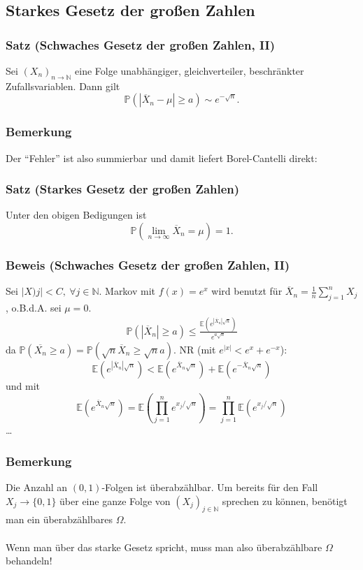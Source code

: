 \subsection{Starkes Gesetz der gro\ss{}en Zahlen}
\subsubsection{Satz (Schwaches Gesetz der gro\ss{}en Zahlen, II)}
Sei $(X_n)_{n\to\mathbb{N}}$ eine Folge unabh\"angiger, gleichverteiler, beschr\"ankter Zufallsvariablen. Dann gilt
\[
\mathbb{P}(|\overline{X}_n-\mu|\geq a)\sim e^{-\sqrt{n}}.
\]
\subsubsection{Bemerkung}
Der ``Fehler'' ist also summierbar und damit liefert Borel-Cantelli direkt:
\subsubsection{Satz (Starkes Gesetz der gro\ss{}en Zahlen)}
Unter den obigen Bedigungen ist
\[
\mathbb{P}(\lim_{n\to\infty}\overline{X}_n=\mu)=1.
\]
\subsubsection{Beweis (Schwaches Gesetz der gro\ss{}en Zahlen, II)}
Sei $|X)j|<C,\ \forall j\in\mathbb{N}$. Markov mit $f(x)=e^x$ wird benutzt f\"ur $\overline{X}_n=\frac{1}{n}\sum_{j=1}^nX_j$, o.B.d.A. sei $\mu=0$.
\begin{align*}
\mathbb{P}(|\overline{X}_n|\geq a)\leq\frac{\mathbb{E}(e^{|\overline{X}_n|\sqrt{n}})}{e^{a\sqrt{n}}}
\end{align*}
da $\mathbb{P}(\overline{X_n}\geq a)=\mathbb{P}(\sqrt{n}\overline{X}_n\geq\sqrt{n}a)$. NR (mit $e^{|x|}<e^x+e^{-x}$):
\[
\mathbb{E}(e^{|\overline{X}_n|\sqrt{n}})
<\mathbb{E}(e^{\overline{X}_n\sqrt{n}})
+\mathbb{E}(e^{-\overline{X}_n\sqrt{n}})
\]
und mit
\[
\mathbb{E}(e^{\overline{X}_n\sqrt{n}})
=
\mathbb{E}(\prod_{j=1}^ne^{x_j/\sqrt{n}})
=
\prod_{j=1}^n\mathbb{E}(e^{x_j/\sqrt{n}})
\]
\ldots\weg
\subsubsection{Bemerkung}
Die Anzahl an $(0,1)$-Folgen ist \"uberabz\"ahlbar. Um bereits f\"ur den Fall $X_j\to\{0,1\}$ \"uber eine ganze Folge von $(X_j)_{j\in\mathbb{N}}$ sprechen zu k\"onnen, ben\"otigt man ein \"uberabz\"ahlbares $\Omega$.
\\~\\
Wenn man \"uber das starke Gesetz spricht, muss man also \"uberabz\"ahlbare $\Omega$ behandeln!
